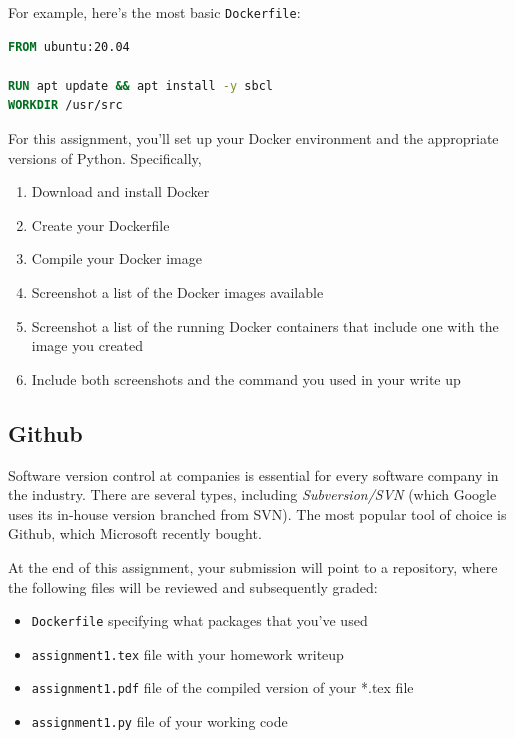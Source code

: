 \documentclass[paper=a4, fontsize=11pt]{scrartcl} %
\numberwithin{equation}{section} %
\numberwithin{figure}{section} %
\numberwithin{table}{section} %
\begin{document}

For example, here's the most basic \verb"Dockerfile":

\begin{lstlisting}[language=Dockerfile]
FROM ubuntu:20.04

RUN apt update && apt install -y sbcl
WORKDIR /usr/src
\end{lstlisting}

For this assignment, you'll set up your Docker environment and the appropriate versions of Python. Specifically,

\begin{enumerate}
    \item Download and install Docker
    \item Create your Dockerfile
    \item Compile your Docker image
    \item Screenshot a list of the Docker images available
    \item Screenshot a list of the running Docker containers that include one with the image you created
    \item Include both screenshots and the command you used in your write up
\end{enumerate}

\subsection{Github}

Software version control at companies is essential for every software company in the industry. There are several types, including \emph{Subversion/SVN} (which Google uses its in-house version branched from SVN). The most popular tool of choice is Github, which Microsoft recently bought. 

At the end of this assignment, your submission will point to a repository, where the following files will be reviewed and subsequently graded:

\begin{itemize}
    \item \verb"Dockerfile" specifying what packages that you've used
    \item \verb"assignment1.tex" file with your homework writeup
    \item \verb"assignment1.pdf" file of the compiled version of your *.tex file
    \item \verb"assignment1.py" file of your working code
\end{itemize}
\end{document}
